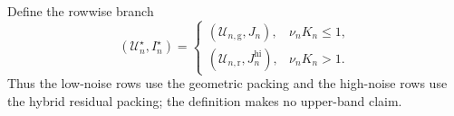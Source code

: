 Define the rowwise branch
\[
 (\mathcal U_n^\star,I_n^\star)=
 \begin{cases}
 (\mathcal U_{n,\mathrm g},J_n),&\nu_nK_n\leq1,\\
 (\mathcal U_{n,\mathrm r},J_n^{\mathrm{hi}}),&\nu_nK_n>1.
 \end{cases}
\]
Thus the low-noise rows use the geometric packing and the high-noise rows use the hybrid residual packing; the definition makes no upper-band claim.